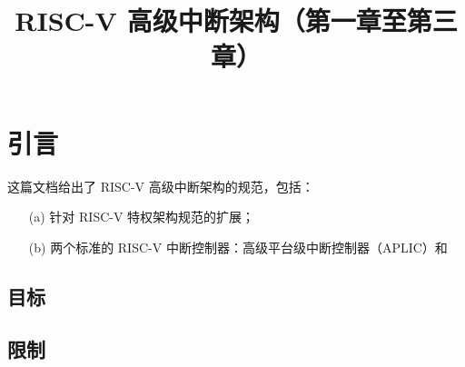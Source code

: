 
\begin{translation}
\label{cha:translation}

\title{RISC-V 高级中断架构（第一章至第三章）}
\maketitle

\tableofcontents

\section{引言}

这篇文档给出了 RISC-V 高级中断架构的规范，包括：

\begin{itemize}
    \item[(a)] 针对 RISC-V 特权架构规范的扩展；
    \item[(b)] 两个标准的 RISC-V 中断控制器：高级平台级中断控制器（APLIC）和
\end{itemize}

\subsection{目标}
\subsection{限制}

\end{translation}
